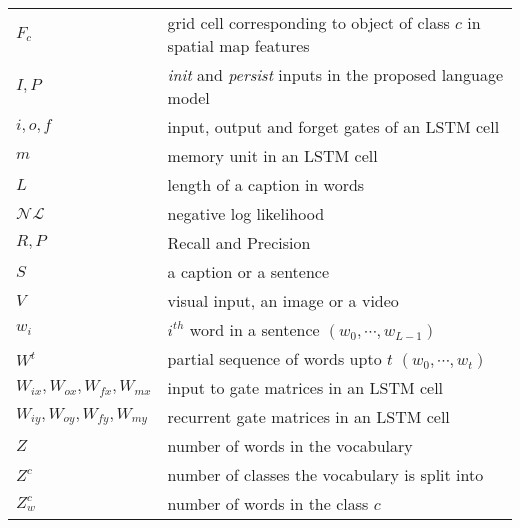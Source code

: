 \begin{longtable}{@{}p{}p{}@{}}
        $F_c$ & grid cell corresponding to object of class $c$ in spatial map
        features\\
        $I, P$ & \emph{init} and \emph{persist} inputs in the proposed language
        model\\
        $i, o, f $ & input, output and forget gates of an LSTM cell \\
        $m$ & memory unit in an LSTM cell \\
        $L$   & length of a caption in words\\
        $\mathcal{NL}$ & negative log likelihood \\
        $R, P$ & Recall and Precision\\
        $S$ & a caption or a sentence\\
        $V$   & visual input, an image or a video\\
        $w_i$   & $i^{th}$ word in a sentence $(w_0,\cdots,w_{L-1})$\\
        $W^t$ & partial sequence of words upto $t$ $(w_0,\cdots,w_t)$\\
        $W_{ix},W_{ox},W_{fx}, W_{mx}$ & input to gate matrices in an LSTM cell \\
        $W_{iy},W_{oy},W_{fy}, W_{my}$ & recurrent gate matrices in an LSTM cell \\
        $Z$   &  number of words in the vocabulary\\
        $Z^c$   & number of classes the vocabulary is split into\\
        $Z_w^c$   & number of words in the class $c$\\

\end{longtable}
\endgroup
